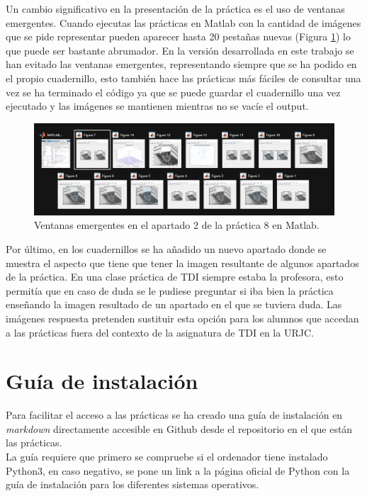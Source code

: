 Un cambio significativo en la presentación de la práctica es el uso de ventanas emergentes. Cuando ejecutas las prácticas en Matlab con la cantidad de imágenes que se pide representar pueden aparecer hasta 20 pestañas nuevas  (Figura \ref{ventanas}) lo que puede ser bastante abrumador. En la versión desarrollada en este trabajo se han evitado las ventanas emergentes, representando siempre que se ha podido en el propio cuadernillo, esto también hace las prácticas más fáciles de consultar una vez se ha terminado el código ya que se puede guardar el cuadernillo una vez ejecutado y las imágenes se mantienen mientras no se vacíe el output.\\

\begin{figure}[h]
\centering
\includegraphics[width=1\textwidth]{imagenes/ventanas}
\caption{Ventanas emergentes en el apartado 2 de la práctica 8 en Matlab.}
\label{ventanas}
\end{figure}

Por último, en los cuadernillos se ha añadido un nuevo apartado donde se muestra el aspecto que tiene que tener la imagen resultante de algunos apartados de la práctica. En una clase práctica de TDI siempre estaba la profesora, esto permitía que en caso de duda se le pudiese preguntar si iba bien la práctica enseñando la imagen resultado de un apartado en el que se tuviera duda. Las imágenes respuesta pretenden sustituir esta opción para los alumnos que accedan a las prácticas fuera del contexto de la asignatura de TDI en la URJC.


\section{Guía de instalación}

Para facilitar el acceso a las prácticas se ha creado una guía de instalación en \emph{markdown} directamente accesible en Github desde el repositorio en el que están las prácticas.\\

La guía requiere que primero se compruebe si el ordenador tiene instalado Python3, en caso negativo, se pone un link a la página oficial de Python con la guía de instalación para los diferentes sistemas operativos.\\

